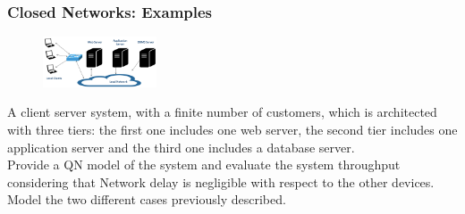 \documentclass[10pt, oneside]{article}
\begin{document}
\subsubsection*{ 
    Closed Networks: Examples}\begin{figure}[H]
        \begin{center}
            \includegraphics[width=0.3\textwidth]{img/img109.png}
            \end{center}
        \end{figure}A client server system, with a finite number of customers, which is architected with three tiers: the first one includes one web server, the second tier includes one application server and the third one includes a database server.\\
        Provide a QN model of the system and evaluate the system throughput considering that Network delay is negligible with respect to the other devices. Model the two different cases previously described.
\end{document}
